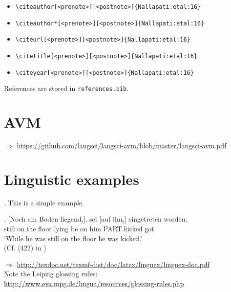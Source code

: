 \begin{itemize}
\item \verb=\citeauthor[<prenote>][<postnote>]{Nallapati:etal:16}= \newline \citeauthor[<prenote>][<postnote>]{Nallapati:etal:16}
\item \verb=\citeauthor*[<prenote>][<postnote>]{Nallapati:etal:16}= \newline \citeauthor*[<prenote>][<postnote>]{Nallapati:etal:16}
\item \verb=\citeurl[<prenote>][<postnote>]{Nallapati:etal:16}= \newline {}
\item \verb=\citetitle[<prenote>][<postnote>]{Nallapati:etal:16}= \newline {}
\item \verb=\citeyear[<prenote>][<postnote>]{Nallapati:etal:16}= \newline \citeyear[<prenote>][<postnote>]{Nallapati:etal:16}
\end{itemize} 

References are stored in \texttt{references.bib}.

\section{AVM}


\medskip

\noindent $\Rightarrow$ \url{https://github.com/langsci/langsci-avm/blob/master/langsci-avm.pdf}

\section{Linguistic examples}

\ex. This is a simple example.

\exg. [Noch am Boden liegend$_i$], sei [auf ihn$_i$] eingetreten worden.\\
still on.the floor lying be on him PART.kicked got\\
`While he was still on the floor he was kicked.'\\
(Cf. (422) in \cite{Mueller:02})

\noindent $\Rightarrow$ \url{http://texdoc.net/texmf-dist/doc/latex/linguex/linguex-doc.pdf} \\
Note the Leipzig glossing rules: \url{http://www.eva.mpg.de/lingua/resources/glossing-rules.php}

